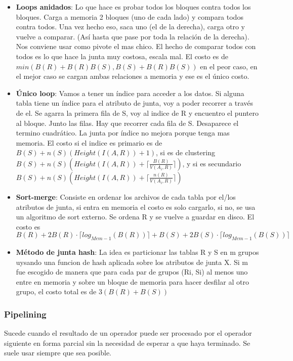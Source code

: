 \begin{itemize}
\item \textbf{Loops anidados}: Lo que hace es probar todos los bloques contra todos los bloques. Carga a memoria 2 bloques (uno de cada lado) y compara todos contra todos. Una vez hecho eso, saca uno (el de la derecha), carga otro y vuelve a comparar. (Así hasta que pase por toda la relación de la derecha). Nos conviene usar como pivote el mas chico. El hecho de comparar todos con todos es lo que hace la junta muy costosa, escala mal. El costo es de $min( B(R) + B(R) B(S), B(S) + B(R) B(S) )$ en el peor caso, en el mejor caso se cargan ambas relaciones a memoria y ese es el único costo. 
\item \textbf{Único loop}: Vamos a tener un índice para acceder a los datos. Si alguna tabla tiene un índice para el atributo de junta, voy a poder recorrer a través de el. Se agarra la primera fila de S, voy al indice de R y encuentro el puntero al bloque. Junto las filas. Hay que recorrer cada fila de S. Desaparece el termino cuadrático. La junta por índice no mejora porque tenga mas memoria. El costo si el indice es primario es de $ B(S) + n(S) (Height(I(A,R)) + 1) $, si es de clustering $B(S) + n(S) (Height(I(A,R)) + \lceil \frac{B(R)}{V(A_i,R)} \rceil )$, y si es secundario $B(S) + n(S) (Height(I(A,R)) + \lceil \frac{n(R)}{V(A_i,R)} \rceil )$
\item \textbf{Sort-merge}: Consiste en ordenar los archivos de cada tabla por el/los atributos de junta, si entra en memoria el costo es solo cargarlo, si no, se usa un algoritmo de sort externo. Se ordena R y se vuelve a guardar en disco. El costo es $ B(R) + 2 B(R) \cdot \lceil log_{Mem-1}(B(R)) \rceil + B(S) + 2 B(S) \cdot \lceil log_{Mem-1}(B(S)) \rceil $
\item \textbf{Método de junta hash}: La idea es particionar las tablas R y S en m grupos uysando una funcion de hash aplicada sobre los atributos de junta X. Si m fue escogido de manera que para cada par de grupos (Ri, Si) al menos uno entre en memoria y sobre un bloque de memoria para hacer desfilar al otro grupo, el costo total es de $3 ( B(R) + B(S) )$
\end{itemize}


\subsubsection*{Pipelining}

Sucede cuando el resultado de un operador puede ser procesado por el operador siguiente en forma parcial sin la necesidad de esperar a que haya terminado. Se suele usar siempre que sea posible.

